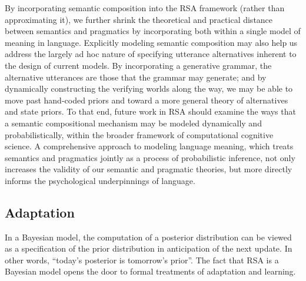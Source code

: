 \documentclass{sp}
\newcommand{\gcs}[1]{\textcolor{blue}{[gcs: #1]}}
\begin{document}
By incorporating semantic composition into the RSA framework (rather than approximating it), we further shrink the theoretical and practical distance between semantics and pragmatics by incorporating both within a single model of meaning in language.
Explicitly modeling semantic composition may also help us address the largely ad hoc nature of specifying utterance alternatives inherent to the design of current models. By incorporating a generative grammar, the alternative utterances are those that the grammar may generate; and by dynamically constructing the verifying worlds along the way, we may be able to move past hand-coded priors and toward a more general theory of alternatives and state priors. 
To that end, future work in RSA should examine the ways that a semantic compositional mechanism may be modeled dynamically and probabilistically, within the broader framework of computational cognitive science. A comprehensive approach to modeling language meaning, which treats semantics and pragmatics jointly as a process of probabilistic inference, not only increases the validity of our semantic and pragmatic theories, but more directly informs the psychological underpinnings of language.



\subsection{Adaptation}

In a Bayesian model, the computation of a posterior distribution can be viewed as a specification of the prior distribution in anticipation of the next update.
In other words, ``today's posterior is tomorrow's prior''.
The fact that RSA is a Bayesian model opens the door to formal treatments of adaptation and learning. 
\end{document}

